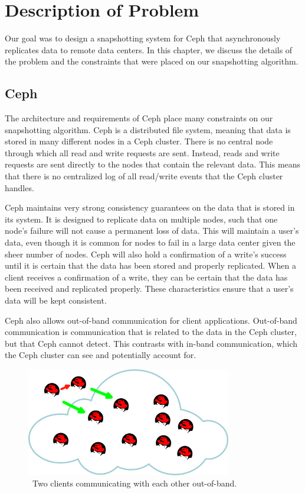 \chapter{Description of Problem}
\label{sec:description}

Our goal was to design a snapshotting system for Ceph that
asynchronously replicates data to remote data centers. In this
chapter, we discuss the details of the problem and the constraints
that were placed on our snapshotting algorithm.

\section{Ceph}

The architecture and requirements of Ceph place many constraints on
our snapshotting algorithm. Ceph is a distributed file system, meaning that data is
stored in many different nodes in a Ceph cluster. There is no central
node through which all read and write requests are sent.  Instead,
reads and write requests are sent directly to the nodes that contain
the relevant data. This means that there is no centralized log of all
read/write events that the Ceph cluster handles.

Ceph maintains very strong consistency guarantees on the data that is 
stored in its system. It is designed to replicate data on multiple nodes, such 
that one node's failure will not cause a permanent loss of data. This will 
maintain a user's data, even though it is common for nodes to fail in a large 
data center given the sheer number of nodes. Ceph will also hold a
confirmation of a write's success until it is certain that the data has been 
stored and properly replicated. When a client receives a confirmation of a write, they can be certain that the data has been received and replicated properly. These characteristics ensure that a user's 
data will be kept consistent.

Ceph also allows out-of-band communication for client applications. 
Out-of-band communication is communication that is related to the data in the 
Ceph cluster, but that Ceph cannot detect. This contrasts with in-band
communication, which the Ceph cluster can see and potentially account for. 

\begin{figure}[!htbp]
  \centering
  \caption{~Two clients communicating with each other out-of-band.} 
  \label{fig:out-of-band}
  \includegraphics[width=0.8\textwidth]{outofbandwrite.png}
\end{figure}

